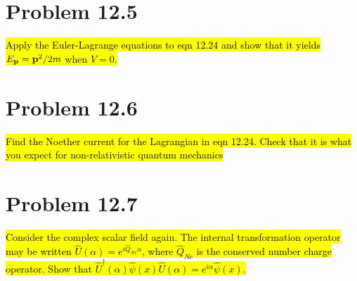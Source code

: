 \documentclass{article}
\begin{document}
\section*{Problem 12.5}
\begin{quoting}
    \hl{Apply the Euler-Lagrange equations to eqn 12.24 and show that it yields $E_{\vb{p}}=\vb{p}^2 /2m$ when $V=0$.}
\end{quoting}


\section*{Problem 12.6}
\begin{quoting}
    \hl{Find the Noether current for the Lagrangian in eqn 12.24. Check that it is what you expect for non-relativistic quantum mechanics}
\end{quoting}


\section*{Problem 12.7}
\begin{quoting}
    \hl{Consider the complex scalar field again. The internal transformation operator may be written $\hat{U}(\alpha)=e^{i\hat{Q}_{Nc}\alpha}$, where $\hat{Q}_{Nc}$ is the conserved number charge operator. Show that $\hat{U}^\dagger (\alpha)\hat{\psi}(x)\hat{U}(\alpha)=e^{i\alpha}\hat{\psi}(x)$.}
\end{quoting}
\end{document}
